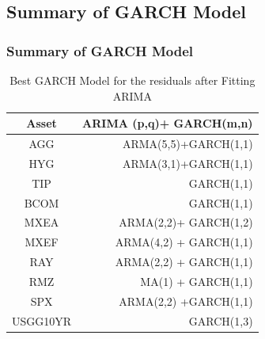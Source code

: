 \documentclass{beamer}
\newcommand\Fontviiii{\fontsize{9}{10.2}\selectfont}
\begin{document}
\subsection{Summary of GARCH Model}
\begin{frame}
\frametitle{Summary of GARCH Model}
\Fontviiii

\begin{table}[!h]
\caption{Best GARCH Model for the residuals after Fitting ARIMA}
\centering 
\begin{tabular}{ | c || r | } 
 \hline
Asset & ARIMA (p,q)+ GARCH(m,n) \\
  \hline \hline
AGG & ARMA(5,5)+GARCH(1,1) \\ 
HYG & ARMA(3,1)+GARCH(1,1) \\ 
TIP &  GARCH(1,1)\\ 
BCOM & GARCH(1,1)\\ 
MXEA & ARMA(2,2)+ GARCH(1,2) \\ 
MXEF & ARMA(4,2) + GARCH(1,1)\\ 
RAY &  ARMA(2,2) + GARCH(1,1)\\ 
RMZ & MA(1) + GARCH(1,1) \\ 
SPX & ARMA(2,2) +GARCH(1,1)\\ 
USGG10YR & GARCH(1,3) \\
 \hline
\end{tabular}
\label{table:BestGarch}
\end{table}
\end{frame}
\end{document}
